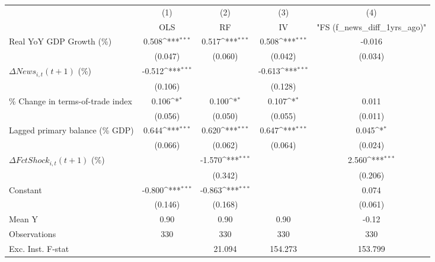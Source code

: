 {
\def\sym#1{\ifmmode^{#1}\else\(^{#1}\)\fi}
\begin{tabular}{l*{4}{c}}
\toprule
                    &\multicolumn{1}{c}{(1)}&\multicolumn{1}{c}{(2)}&\multicolumn{1}{c}{(3)}&\multicolumn{1}{c}{(4)}\\
                    &\multicolumn{1}{c}{OLS}&\multicolumn{1}{c}{RF}&\multicolumn{1}{c}{IV}&\multicolumn{1}{c}{ "FS (f_news_diff_1yrs_ago)" }\\
\midrule
Real YoY GDP Growth (\%)&       0.508\sym{***}&       0.517\sym{***}&       0.508\sym{***}&      -0.016         \\
                    &     (0.047)         &     (0.060)         &     (0.042)         &     (0.034)         \\
\addlinespace
$ \Delta News_{i,t}(t+1)$ (\%)&      -0.512\sym{***}&                     &      -0.613\sym{***}&                     \\
                    &     (0.106)         &                     &     (0.128)         &                     \\
\addlinespace
\% Change in terms-of-trade index&       0.106\sym{*}  &       0.100\sym{*}  &       0.107\sym{*}  &       0.011         \\
                    &     (0.056)         &     (0.050)         &     (0.055)         &     (0.011)         \\
\addlinespace
Lagged primary balance (\% GDP)&       0.644\sym{***}&       0.620\sym{***}&       0.647\sym{***}&       0.045\sym{*}  \\
                    &     (0.066)         &     (0.062)         &     (0.064)         &     (0.024)         \\
\addlinespace
$ \Delta FctShock_{i,t}(t+1)$ (\%)&                     &      -1.570\sym{***}&                     &       2.560\sym{***}\\
                    &                     &     (0.342)         &                     &     (0.206)         \\
\addlinespace
Constant            &      -0.800\sym{***}&      -0.863\sym{***}&                     &       0.074         \\
                    &     (0.146)         &     (0.168)         &                     &     (0.061)         \\
\midrule
Mean Y              &        0.90         &        0.90         &        0.90         &       -0.12         \\
Observations        &         330         &         330         &         330         &         330         \\
Exc. Inst. F-stat   &                     &      21.094         &     154.273         &     153.799         \\
\bottomrule
\end{tabular}
}
